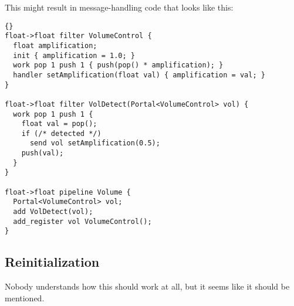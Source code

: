 \documentclass[11pt]{article}
\begin{document}
This might result in message-handling code that looks like this:

\begin{lstlisting}{}
float->float filter VolumeControl {
  float amplification;
  init { amplification = 1.0; }
  work pop 1 push 1 { push(pop() * amplification); }
  handler setAmplification(float val) { amplification = val; }
}

float->float filter VolDetect(Portal<VolumeControl> vol) {
  work pop 1 push 1 {
    float val = pop();
    if (/* detected */)
      send vol setAmplification(0.5);
    push(val);
  }
}

float->float pipeline Volume {
  Portal<VolumeControl> vol;
  add VolDetect(vol);
  add_register vol VolumeControl();
}
\end{lstlisting}

\subsection{Reinitialization}

Nobody understands how this should work at all, but it seems like it
should be mentioned.
\end{document}
